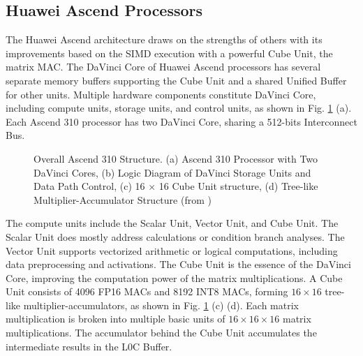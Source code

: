 \documentclass[12pt]{extbook}
\begin{document}
\subsection{Huawei Ascend Processors}
\label{Sec:1_1_2}

The Huawei Ascend architecture draws on the strengths of others with its improvements based on the SIMD execution with a powerful Cube Unit, the matrix MAC. The DaVinci Core of Huawei Ascend processors has several separate memory buffers supporting the Cube Unit and a shared Unified Buffer for other units. Multiple hardware components constitute DaVinci Core, including compute units, storage units, and control units, as shown in Fig. \ref{fig:dav} (a). Each Ascend 310 processor has two DaVinci Core, sharing a 512-bits Interconnect Bus.

\begin{figure}[tb]
    \caption{Overall Ascend 310 Structure. (a) Ascend 310 Processor with Two DaVinci Cores, (b) Logic Diagram of DaVinci Storage Units and Data Path Control, (c) 16 $\times$ 16 Cube Unit structure, (d) Tree-like Multiplier-Accumulator Structure (from \cite{DBLP:conf/hotchips/LiaoTXZ19})}
    \label{fig:dav}
    \end{figure}

The compute units include the Scalar Unit, Vector Unit, and Cube Unit. The Scalar Unit does mostly address calculations or condition branch analyses. The Vector Unit supports vectorized arithmetic or logical computations, including data preprocessing and activations. The Cube Unit is the essence of the DaVinci Core, improving the computation power of the matrix multiplications. A Cube Unit consists of 4096 FP16 MACs and 8192 INT8 MACs, forming $16 \times 16$ tree-like multiplier-accumulators, as shown in Fig. \ref{fig:dav} (c) (d). Each matrix multiplication is broken into multiple basic units of $16 \times 16 \times 16$ matrix multiplications. The accumulator behind the Cube Unit accumulates the intermediate results in the L0C Buffer.
\end{document}
